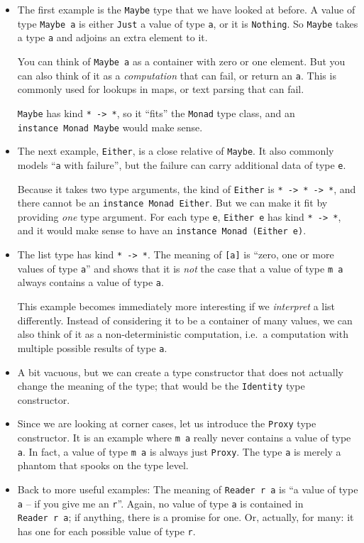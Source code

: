 \documentclass[11pt,
  american,
  DIV13]{article}
\begin{document}
\begin{itemize}
\item
  The first example is the \texttt{Maybe} type that we have looked at
  before. A value of type \texttt{Maybe\ a} is either \texttt{Just} a
  value of type \texttt{a}, or it is \texttt{Nothing}. So \texttt{Maybe}
  takes a type \texttt{a} and adjoins an extra element to it.

  You can think of \texttt{Maybe\ a} as a container with zero or one
  element. But you can also think of it as a \emph{computation} that can
  fail, or return an \texttt{a}. This is commonly used for lookups in
  maps, or text parsing that can fail.

  \texttt{Maybe} has kind \texttt{*\ -\textgreater{}\ *}, so it ``fits''
  the \texttt{Monad} type class, and an \texttt{instance\ Monad\ Maybe}
  would make sense.
\item
  The next example, \texttt{Either}, is a close relative of
  \texttt{Maybe}. It also commonly models ``\texttt{a} with failure'',
  but the failure can carry additional data of type \texttt{e}.

  Because it takes two type arguments, the kind of \texttt{Either} is
  \texttt{*\ -\textgreater{}\ *\ -\textgreater{}\ *}, and there cannot
  be an \texttt{instance\ Monad\ Either}. But we can make it fit by
  providing \emph{one} type argument. For each type \texttt{e},
  \texttt{Either\ e} has kind \texttt{*\ -\textgreater{}\ *}, and it
  would make sense to have an \texttt{instance\ Monad\ (Either\ e)}.
\item
  The list type has kind \texttt{*\ -\textgreater{}\ *}. The meaning of
  \texttt{{[}a{]}} is ``zero, one or more values of type \texttt{a}''
  and shows that it is \emph{not} the case that a value of type
  \texttt{m\ a} always contains a value of type \texttt{a}.

  This example becomes immediately more interesting if we
  \emph{interpret} a list differently. Instead of considering it to be a
  container of many values, we can also think of it as a
  non-deterministic computation, i.e.~a computation with multiple
  possible results of type \texttt{a}.
\item
  A bit vacuous, but we can create a type constructor that does not
  actually change the meaning of the type; that would be the
  \texttt{Identity} type constructor.
\item
  Since we are looking at corner cases, let us introduce the
  \texttt{Proxy} type constructor. It is an example where \texttt{m\ a}
  really never contains a value of type \texttt{a}. In fact, a value of
  type \texttt{m\ a} is always just \texttt{Proxy}. The type \texttt{a}
  is merely a phantom that spooks on the type level.
\item
  Back to more useful examples: The meaning of \texttt{Reader\ r\ a} is
  ``a value of type \texttt{a} -- if you give me an \texttt{r}''. Again,
  no value of type \texttt{a} is contained in \texttt{Reader\ r\ a}; if
  anything, there is a promise for one. Or, actually, for many: it has
  one for each possible value of type \texttt{r}.


\end{itemize}
\end{document}
